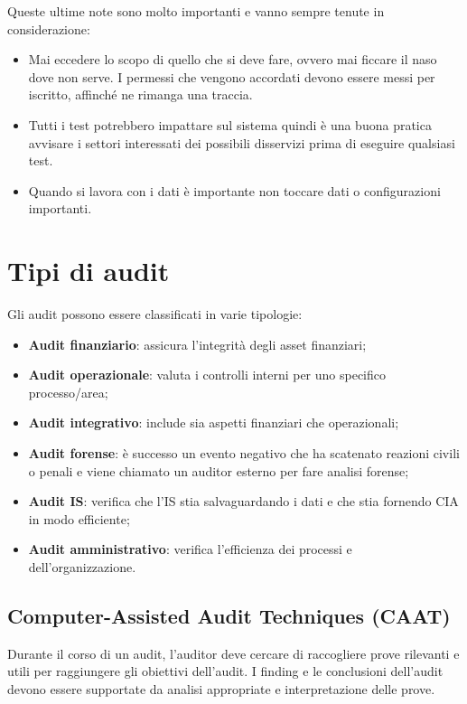 Queste ultime note sono molto importanti e vanno sempre tenute in
considerazione:
\begin{itemize}
\item Mai eccedere lo scopo di quello che si deve fare, ovvero mai ficcare il
naso dove non serve. I permessi che vengono accordati devono essere messi per
iscritto, affinché ne rimanga una traccia.
\item Tutti i test potrebbero impattare sul sistema quindi è una buona
pratica avvisare i settori interessati dei possibili disservizi prima di
eseguire qualsiasi test.
\item Quando si lavora con i dati è importante non toccare dati o configurazioni
importanti.
\end{itemize}


\section{Tipi di audit}

Gli audit possono essere classificati in varie tipologie:
\begin{itemize}
\item \textbf{Audit finanziario}: assicura l'integrità degli asset
finanziari;
\item \textbf{Audit operazionale}: valuta i controlli interni per uno
specifico processo/area;
\item \textbf{Audit integrativo}: include sia aspetti finanziari
che operazionali;
\item \textbf{Audit forense}: è successo un evento negativo che ha
scatenato reazioni civili o penali e viene chiamato un auditor
esterno per fare analisi forense;
\item \textbf{Audit IS}: verifica che l'IS stia salvaguardando i dati
e che stia fornendo CIA in modo efficiente;
\item \textbf{Audit amministrativo}: verifica l'efficienza dei processi
e dell'organizzazione.
\end{itemize}


\subsection{Computer-Assisted Audit Techniques (CAAT)}
Durante il corso di un audit, l'auditor deve cercare di raccogliere
prove rilevanti e utili per raggiungere gli obiettivi dell'audit.
I finding e le conclusioni dell'audit devono essere supportate da 
analisi appropriate e interpretazione delle prove.

